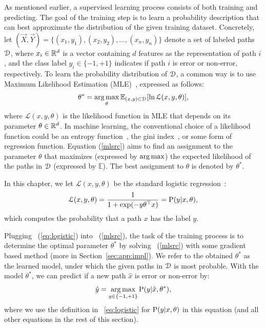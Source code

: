 \documentclass[12pt]{report}	%
\begin{document}
As mentioned earlier, a supervised learning process consists of
both training and predicting. The goal of the training step
is to learn a probability description that can best 
approximate the distribution of the given training dataset. 
Concretely, let $(\vec{X}, \vec{Y}) = \{ (x_1,y_1),(x_2,y_2),\ldots,(x_n,y_n) \}$
denote a set of labeled paths $\mathcal{D}$,
where $x_i \in \mathbb{R}^{d}$ is a vector containing $d$ features as the representation of path $i$,
and the class label $y_i \in \{ -1, +1\}$
indicates if path $i$ is error or non-error, respectively.
%
To learn the probability distribution of $\mathcal{D}$,
a common way is to use Maximum Likelihood Estimation (MLE)~\cite{vapnik2013nature}, expressed as follows:
%
\begin{equation} \label{mlsrc}
\theta^* 
 = \operatorname*{arg\,max}_{\theta} \mathbb{E}_{(x, y) \in \mathcal{D}}[\ln \mathcal{L}(x, y, \theta)], 
\end{equation}
%
where $\mathcal{L}(x, y, \theta)$ is the likelihood function in MLE that 
depends on its parameter $\theta \in \mathbb{R}^{d}$.
In machine learning, the conventional choice of a likelihood function
could be an entropy function~\cite{nigam1999using}, 
the gini index~\cite{breiman2017classification},
or some form of regression function. 
%
Equation (\ref{mlsrc}) aims to find an assignment to the parameter 
$\theta$ that maximizes (expressed by $\operatorname*{arg\,max}$)
the expected likelihood of the paths in $\mathcal{D}$ (expressed by $\mathbb{E}$). 
The best assignment to
$\theta$ is denoted by $\theta^*$. 

In this chapter, we let $\mathcal{L}(x, y, \theta)$ 
be
the standard 
logistic regression~\cite{kleinbaum2002logistic}:
%
\begin{equation} \label{eq:logistic}
\mathcal{L}(x, y, \theta) = \frac{1}{1 + \text{exp}(-y \theta^{\top} x)} = \text{P}(y | x, \theta),
\end{equation}
%
which computes the probability that a path $x$ has the label $y$.

Plugging \eqn~(\ref{eq:logistic}) into \eqn\ (\ref{mlsrc}),
the task of the training process is to determine the optimal parameter $\theta^*$
by solving \eqn~(\ref{mlsrc}) with some gradient based method (more in Section~\ref{sec:app:impl}).
%
We refer to the obtained $\theta^*$ as the learned model,
under which the given paths in $\mathcal{D}$ is most probable.
%
With the model $\theta^*$, we can predict if a new path $\hat{x}$
is error or non-error by:
%
\begin{equation} \label{predict}
\hat{y} = \operatorname*{arg\,max}_{y \in \{ -1, +1\}} \text{P} (y | \hat{x}, \theta^*),
\end{equation}
%
where we use the definition in \eqn~\eqref{eq:logistic} for 
$\text{P} (y | x, \theta)$ in this equation (and all other equations in the rest of this section).
\end{document}
